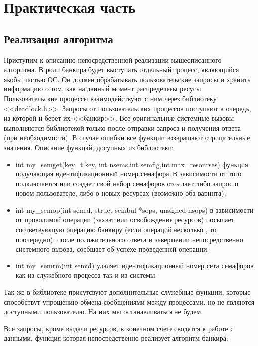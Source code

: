﻿\section{Практическая часть}
\subsection{Реализация алгоритма}
Приступим к описанию непосредственной реализации вышеописанного алгоритма. 
В роли банкира будет выступать отдельный процесс, являющийся якобы частью ОС. Он должен обрабатывать пользовательские запросы и хранить информацию о том, как на данный момент распределены ресусы. Пользовательские процессы взаимодействуют с ним через библиотеку <<deadlock.h>>. Запросы от пользовательских процессов поступают в очередь, из которой и берет их <<банкир>>. Все оригинальные системные вызовы выполняются библиотекой только после отправки запроса и получения ответа (при необходимости).
В случае ошибки все функции возвращают отрицательные значения. 
Описание функций, досупных из библиотеки:

\begin{itemize}
    \item int my\_semget(key\_t key, int nsems,int semflg,int max\_resourses) функция получающая идентификационный номер семафора. В зависимости от того подключается или создает свой набор семафоров отсылает либо запрос о новом пользователе, либо о новых ресурсах  (возможно оба варинта);

    \item int my\_semop(int semid, struct sembuf *sops, unsigned nsops) в зависимости от проводимой операции (захват или освобождение ресурсов) посылает соответвующую операцию банкиру (если операций несколько , то поочередно), после положительного ответа и завершении непосредственно системного вызова, сообщает об успехе проведенной операции;
    \item int my\_semrm(int semid) удаляет идентификационный номер сета семафоров как из служебного процесса так и из системы. 

\end{itemize}

Так же в библиотеке присутсвуют дополнительные служебные функции, которые способствут упрощению обмена сообщениями между процессами, но не являются доступными пользователю. На них мы останавливаться не будем.

Все запросы, кроме выдачи ресурсов, в конечном счете сводятся к работе с данными, функция которая непосредственно реализует алгоритм банкира:
\\
{
\small

}

